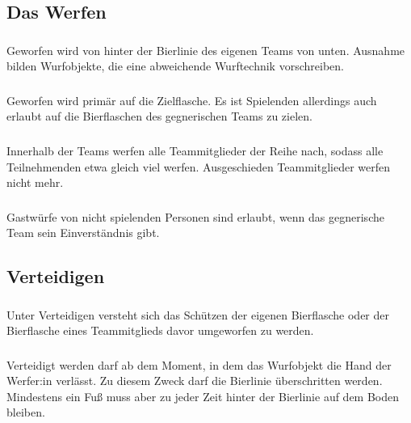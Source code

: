 \subsection{Das Werfen}
\subsubsection{}
Geworfen wird von hinter der Bierlinie des eigenen Teams von unten.
Ausnahme bilden Wurfobjekte, die eine abweichende Wurftechnik vorschreiben.

\subsubsection{}
Geworfen wird primär auf die Zielflasche.
Es ist Spielenden allerdings auch erlaubt auf die Bierflaschen des gegnerischen Teams zu zielen.

\subsubsection{}
Innerhalb der Teams werfen alle Teammitglieder der Reihe nach, sodass alle Teilnehmenden etwa gleich viel werfen.
Ausgeschieden Teammitglieder werfen nicht mehr.

\subsubsection{}
Gastwürfe von nicht spielenden Personen sind erlaubt, wenn das gegnerische Team sein Einverständnis gibt.

\subsection{Verteidigen}
\subsubsection{}
Unter Verteidigen versteht sich das Schützen der eigenen Bierflasche oder der Bierflasche eines Teammitglieds davor umgeworfen zu werden.

\subsubsection{}
Verteidigt werden darf ab dem Moment, in dem das Wurfobjekt die Hand der Werfer:in verlässt.
Zu diesem Zweck darf die Bierlinie überschritten werden.
Mindestens ein Fuß muss aber zu jeder Zeit hinter der Bierlinie auf dem Boden bleiben.

